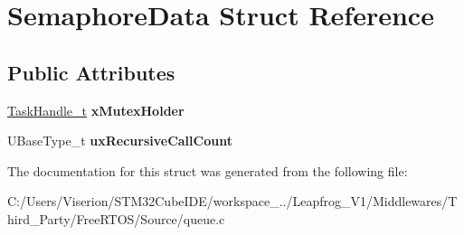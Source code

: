 \hypertarget{struct_semaphore_data}{}\section{Semaphore\+Data Struct Reference}
\label{struct_semaphore_data}
\subsection*{Public Attributes}
\begin{DoxyCompactItemize}
\item 
\mbox{\label{struct_semaphore_data_ab1ed54c7b39dc45b3c310fae7ad08693}} 
\mbox{\hyperlink{structtsk_task_control_block}{Task\+Handle\+\_\+t}} {\bfseries x\+Mutex\+Holder}
\item 
\mbox{\label{struct_semaphore_data_aa428fcfc6e5831d054234444fde56574}} 
U\+Base\+Type\+\_\+t {\bfseries ux\+Recursive\+Call\+Count}
\end{DoxyCompactItemize}


The documentation for this struct was generated from the following file\+:\begin{DoxyCompactItemize}
\item 
C\+:/\+Users/\+Viserion/\+S\+T\+M32\+Cube\+I\+D\+E/workspace\+\_../\+Leapfrog\+\_\+\+V1/\+Middlewares/\+Third\+\_\+\+Party/\+Free\+R\+T\+O\+S/\+Source/queue.\+c\end{DoxyCompactItemize}
